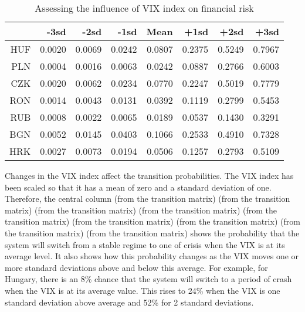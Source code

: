 \documentclass[12pt, a4paper, oneside]{article}\usepackage[]{graphicx}\usepackage[]{color}
\begin{document}
\begin{table}[t]
\begin{threeparttable}
\centering
\begin{tabular}{rrrrrrrr}
  \hline
 & -3sd & -2sd & -1sd & Mean & +1sd & +2sd & +3sd \\ 
  \hline
  HUF & 0.0020 & 0.0069 & 0.0242 & 0.0807 & 0.2375 & 0.5249 & 0.7967 \\ 
  PLN & 0.0004 & 0.0016 & 0.0063 & 0.0242 & 0.0887 & 0.2766 & 0.6003 \\ 
  CZK & 0.0020 & 0.0062 & 0.0234 & 0.0770 & 0.2247 & 0.5019 & 0.7779 \\ 
  RON & 0.0014 & 0.0043 & 0.0131 & 0.0392 & 0.1119 & 0.2799 & 0.5453 \\ 
  RUB & 0.0008 & 0.0022 & 0.0065 & 0.0189 & 0.0537 & 0.1430 & 0.3291 \\
  BGN & 0.0052 & 0.0145 & 0.0403 & 0.1066 & 0.2533 & 0.4910 & 0.7328 \\ 
  HRK & 0.0027 & 0.0073 & 0.0194 & 0.0506 & 0.1257 & 0.2793 & 0.5109 \\ 
   \hline
\end{tabular}
\begin{tablenotes}
\small
\item Changes in the VIX index affect the transition probabilities.  The VIX index has been scaled so that it has a mean of zero and a standard deviation of one.  Therefore, the central column (from the transition matrix) (from the transition matrix) (from the transition matrix) (from the transition matrix) (from the transition matrix) (from the transition matrix) (from the transition matrix) (from the transition matrix) (from the transition matrix) shows the probability that the system will switch from a stable regime to one of crisis when the VIX is at its average level.  It also shows how this probability changes as the VIX moves one or more standard deviations above and below this average. For example, for Hungary, there is an 8\% chance that the system will switch to a period of crash when the VIX is at its average value.  This rises to 24\% when the VIX is one standard deviation above average and 52\% for 2 standard deviations.  
\end{tablenotes}
\caption{Assessing the influence of VIX index on financial risk} 
\label{tabref:vixtranprob}
\end{threeparttable}
\end{table}
\end{document}
